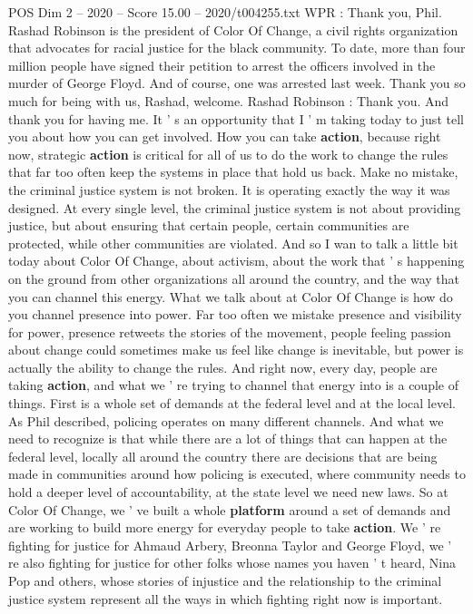 \begin{textsample}{POS Dim 2 – 2020 – Score 15.00 – 2020/t004255.txt}
WPR : Thank you, Phil.
Rashad Robinson is the president of Color Of Change, a civil rights organization that advocates for racial justice for the black community.
To date, more than four million people have signed their petition to arrest the officers involved in the murder of George Floyd.
And of course, one was arrested last week.
Thank you so much for being with us, Rashad, welcome.
Rashad Robinson : Thank you.
And thank you for having me.
It ' s an opportunity that I ' m taking today to just tell you about how you can get involved.
How you can take \textbf{action}, because right now, strategic \textbf{action} is critical for all of us to do the work to change the rules that far too often keep the systems in place that hold us back.
Make no mistake, the criminal justice system is not broken.
It is operating exactly the way it was designed.
At every single level, the criminal justice system is not about providing justice, but about ensuring that certain people, certain communities are protected, while other communities are violated.
And so I wan to talk a little bit today about Color Of Change, about activism, about the work that ' s happening on the ground from other organizations all around the country, and the way that you can channel this energy.
What we talk about at Color Of Change is how do you channel presence into power.
Far too often we mistake presence and visibility for power, presence retweets the stories of the movement, people feeling passion about change could sometimes make us feel like change is inevitable, but power is actually the ability to change the rules.
And right now, every day, people are taking \textbf{action}, and what we ' re trying to channel that energy into is a couple of things.
First is a whole set of demands at the federal level and at the local level.
As Phil described, policing operates on many different channels.
And what we need to recognize is that while there are a lot of things that can happen at the federal level, locally all around the country there are decisions that are being made in communities around how policing is executed, where community needs to hold a deeper level of accountability, at the state level we need new laws.
So at Color Of Change, we ' ve built a whole \textbf{platform} around a set of demands and are working to build more energy for everyday people to take \textbf{action}.
We ' re fighting for justice for Ahmaud Arbery, Breonna Taylor and George Floyd, we ' re also fighting for justice for other folks whose names you haven ' t heard, Nina Pop and others, whose stories of injustice and the relationship to the criminal justice system represent all the ways in which fighting right now is important.

\end{textsample}
